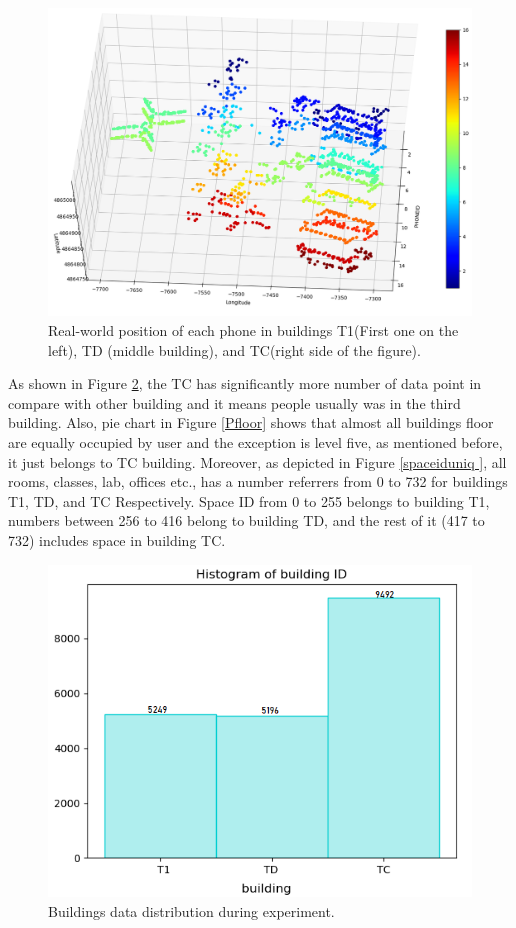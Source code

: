 \begin{figure}
    \centering
    \includegraphics[width = 10 cm]{image/Chapters/Chapter6/LatLongUser.png}
    \caption{Real-world position of each phone in buildings T1(First one on the left), TD (middle building), and TC(right side of the figure).}
    \label{phoneall}
\end{figure}





As shown in Figure \ref{bdd}, the TC has significantly more number of data point in compare with other building  and it means people usually was in the third building. Also, pie chart in Figure \ref{Pfloor} shows that almost all buildings floor are equally occupied by user and the exception is level five, as mentioned before, it just belongs to TC building. Moreover, as depicted in Figure \ref{spaceiduniq }, all rooms, classes, lab, offices etc., has a number referrers from 0 to 732 for  buildings T1, TD, and TC Respectively. Space ID from 0 to 255 belongs to building T1, numbers between 256 to 416 belong to building TD, and the rest of it (417 to 732) includes space in building TC.



\begin{figure}
    \centering
    \includegraphics[width = 12 cm]{image/Chapters/Chapter6/buidlingID.png}
    \caption{Buildings data distribution during experiment. }
    \label{bdd}
\end{figure}




